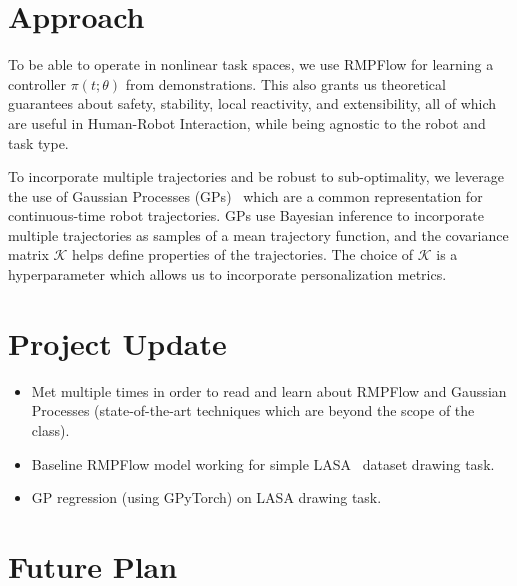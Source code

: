 \documentclass{article}
\begin{document}
\section{Approach}

To be able to operate in nonlinear task spaces, we use RMPFlow for learning a controller $\pi(t; \theta)$ from demonstrations. This also grants us theoretical guarantees about safety, stability, local reactivity, and extensibility, all of which are useful in Human-Robot Interaction, while being agnostic to the robot and task type.

To incorporate multiple trajectories and be robust to sub-optimality, we leverage the use of Gaussian Processes (GPs)~\cite{Mukadam18ijrr,Bhardwaj20icra,vanWaveren22manuscript} which are a common representation for continuous-time robot trajectories. GPs use Bayesian inference to incorporate multiple trajectories as samples of a mean trajectory function, and the covariance matrix $\mathcal{K}$ helps define properties of the trajectories. The choice of $\mathcal{K}$ is a hyperparameter which allows us to incorporate personalization metrics.



\section{Project Update}


\begin{itemize}
    \item Met multiple times in order to read and learn about RMPFlow and Gaussian Processes (state-of-the-art techniques which are beyond the scope of the class).
    \item Baseline RMPFlow model working for simple LASA~\cite{Khansari-Zadeh11tro} dataset drawing task.
    \item GP regression (using GPyTorch) on LASA drawing task.
\end{itemize}


\section{Future Plan}
\end{document}
